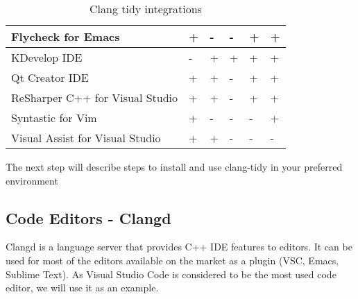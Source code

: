 \begin{table}[H]
\begin{tabular}{|m{2.5cm}| >{\centering\arraybackslash} m{2cm}|>{\centering\arraybackslash} m{2cm}|>{\centering\arraybackslash} m{2cm}|>{\centering\arraybackslash} m{2cm}|>{\centering\arraybackslash} m{2cm}|}
         \hline  \scriptsize{Flycheck for Emacs} & \scriptsize{+} & \scriptsize{-} &  \scriptsize{-} &  \scriptsize{+} &  \scriptsize{+}  \\

         \hline  \scriptsize{KDevelop IDE} & \scriptsize{-} & \scriptsize{+} &  \scriptsize{+} &  \scriptsize{+} &  \scriptsize{+}  \\

         \hline  \scriptsize{Qt Creator IDE} & \scriptsize{+} & \scriptsize{+} &  \scriptsize{-} &  \scriptsize{+} &  \scriptsize{+}  \\

         \hline  \scriptsize{ReSharper C++ for Visual Studio} & \scriptsize{+} & \scriptsize{+} &  \scriptsize{-} &  \scriptsize{+} &  \scriptsize{+}  \\

         \hline  \scriptsize{Syntastic for Vim} & \scriptsize{+} & \scriptsize{-} &  \scriptsize{-} &  \scriptsize{-} &  \scriptsize{+}  \\

         \hline  \scriptsize{Visual Assist for Visual Studio} & \scriptsize{+} & \scriptsize{+} &  \scriptsize{-} &  \scriptsize{-} &  \scriptsize{-}  \\  \hline
    \end{tabular}
    \caption{Clang tidy integrations}
    \label{tab:tidy-integrations}
\end{table}

The next step will describe steps to install and use clang-tidy in your preferred environment 

\subsection{Code Editors - Clangd}
Clangd \cite{clangd} is a language server that provides C++ IDE features to editors. It can be used for most of the editors available on the market as a plugin (VSC, Emacs, Sublime Text). As Visual Studio Code is considered to be the most used code editor, we will use it as an example. 

